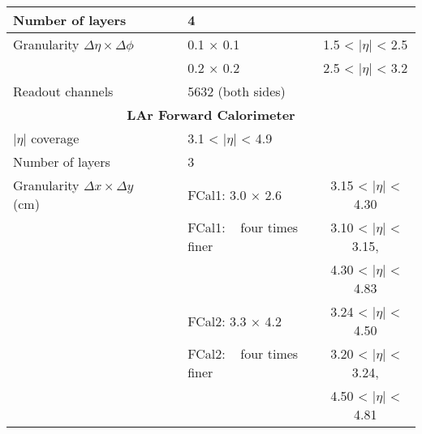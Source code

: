 \begin{table}[]
\begin{tabular}{|l|lc|lc|}
Number of layers                               &                   &                                    & 4                               &                                     \\
\hline 
Granularity $\Delta \eta \times \Delta \phi$   &                   &                                    & 0.1 × 0.1                       & 1.5 < $|\eta|$ < 2.5     \\
                                               &                   &                                    & 0.2 × 0.2                       & 2.5 < $|\eta|$ < 3.2     \\
\hline 
Readout channels                               &                   &                                    & 5632 (both sides)               &                                     \\
\hline 
                                                       \multicolumn{5}{|c|}{\textbf{LAr Forward Calorimeter}} \\
\hline 
$|\eta|$ coverage                              &                   &                                    & 3.1 < $|\eta|$ < 4.9 &                                     \\
Number of layers                               &                   &                                    & 3                               &                                     \\
\hline 
Granularity $\Delta x \times \Delta y$ (cm)    &                   &                                    & FCal1: 3.0 × 2.6                & 3.15 < $|\eta|$ < 4.30   \\
                                               &                   &                                    & FCal1: ~ four times finer       & 3.10 < $|\eta|$ < 3.15,  \\
                                               &                   &                                    &                                 & 4.30 < $|\eta|$ < 4.83   \\
                                               &                   &                                    & FCal2: 3.3 × 4.2                & 3.24 < $|\eta|$ < 4.50   \\
                                               &                   &                                    & FCal2: ~ four times finer       & 3.20 < $|\eta|$ < 3.24,  \\
                                               &                   &                                    &                                 & 4.50 < $|\eta|$ < 4.81   \\

\end{tabular}
\end{table}
